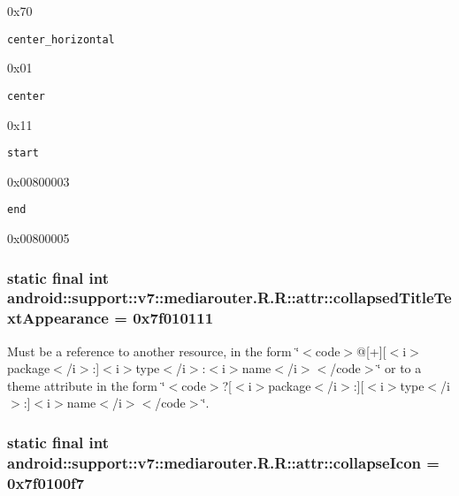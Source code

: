 0x70

{\tt center\_\-horizontal}

0x01

{\tt center}

0x11

{\tt start}

0x00800003

{\tt end}

0x00800005\hypertarget{classandroid_1_1support_1_1v7_1_1mediarouter_1_1_r_1_1attr_a6b2e41af004b5c7ab17609e22018109}{
\subsubsection[{collapsedTitleTextAppearance}]{\setlength{\rightskip}{0pt plus 5cm}static final int android::support::v7::mediarouter.R.R::attr::collapsedTitleTextAppearance = 0x7f010111}}
\label{classandroid_1_1support_1_1v7_1_1mediarouter_1_1_r_1_1attr_a6b2e41af004b5c7ab17609e22018109}


Must be a reference to another resource, in the form \char`\"{}$<$code$>$@\mbox{[}+\mbox{]}\mbox{[}$<$i$>$package$<$/i$>$:\mbox{]}$<$i$>$type$<$/i$>$:$<$i$>$name$<$/i$>$$<$/code$>$\char`\"{} or to a theme attribute in the form \char`\"{}$<$code$>$?\mbox{[}$<$i$>$package$<$/i$>$:\mbox{]}\mbox{[}$<$i$>$type$<$/i$>$:\mbox{]}$<$i$>$name$<$/i$>$$<$/code$>$\char`\"{}. \hypertarget{classandroid_1_1support_1_1v7_1_1mediarouter_1_1_r_1_1attr_35086fa3525b4fff2e258e403ec3325a}{
\subsubsection[{collapseIcon}]{\setlength{\rightskip}{0pt plus 5cm}static final int android::support::v7::mediarouter.R.R::attr::collapseIcon = 0x7f0100f7}}
\label{classandroid_1_1support_1_1v7_1_1mediarouter_1_1_r_1_1attr_35086fa3525b4fff2e258e403ec3325a}


